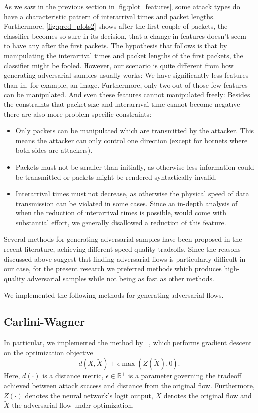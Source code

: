 \documentclass[sigconf,nonacm]{acmart}
\begin{document}
As we saw in the previous section in \autoref{fig:plot_features}, some attack types do have a characteristic pattern of interarrival times and packet lengths. Furthermore, \autoref{fig:pred_plots2} shows after the first couple of packets, the classifier becomes so sure in its decision, that a change in features doesn't seem to have any after the first packets. The hypothesis that follows is that by manipulating the interarrival times and packet lengths of the first packets, the classifier might be fooled. However, our scenario is quite different from how generating adversarial samples usually works: We have significantly less features than in, for example, an image. Furthermore, only two out of those few features can be manipulated. And even these features cannot manipulated freely: Besides the constraints that packet size and interarrival time cannot become negative there are also more problem-specific constraints:
\begin{itemize}
\item Only packets can be manipulated which are transmitted by the attacker. This means the attacker can only control one direction (except for botnets where both sides are attackers). 
\item Packets must not be smaller than initially, as otherwise less information could be transmitted or packets might be rendered syntactically invalid.
\item Interarrival times must not decrease, as otherwise the physical speed of data transmission can be violated in some cases. Since an in-depth analysis of when the reduction of interarrival times is possible, would come with substantial effort, we generally disallowed a reduction of this feature.
\end{itemize}

Several methods for generating adversarial samples have been proposed in the recent literature, achieving different speed-quality tradeoffs. Since the reasons discussed above suggest that finding adversarial flows is particularly difficult in our case, for the present research we preferred methods which produces high-quality adversarial samples while not being as fast as other methods.

We implemented the following methods for generating adversarial flows.

\subsection{Carlini-Wagner}
In particular, we implemented the method by \citeauthor{carlini2017towards}~\cite{carlini2017towards}, which performs gradient descent on the optimization objective 
\begin{equation} \label{eq:carliniWagner}
d(X,\tilde X) + \epsilon  \max(Z(\tilde X), 0).
\end{equation}
Here, $d(\cdot)$ is a distance metric, $\epsilon \in \mathbb R^+$ is a parameter governing the tradeoff achieved between attack success and distance from the original flow. Furthermore, $Z(\cdot)$ denotes the neural network's logit output, $X$ denotes the original flow and $\tilde X$ the adversarial flow under optimization. 
\end{document}
